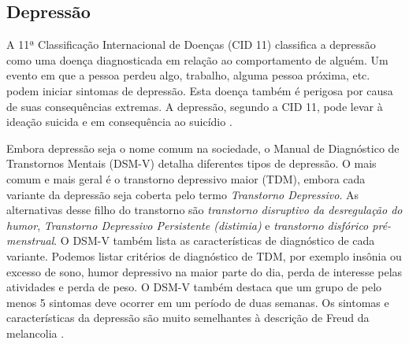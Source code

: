 \documentclass[11pt, notitlepage]{article} %
\begin{document}
\subsection*{Depressão}

A 11ª Classificação Internacional de Doenças (CID 11) classifica a depressão como uma doença diagnosticada em relação ao comportamento de alguém. Um evento em que a pessoa perdeu algo, trabalho, alguma pessoa próxima, etc. podem iniciar sintomas de depressão. Esta doença também é perigosa por causa de suas consequências extremas. A depressão, segundo a CID 11, pode levar à ideação suicida e em consequência ao suicídio \cite{american2013diagnostic}.

Embora depressão seja o nome comum na sociedade, o Manual de Diagnóstico de Transtornos Mentais (DSM-V) detalha diferentes tipos de depressão. O mais comum e mais geral é o transtorno depressivo maior (TDM), embora cada variante da depressão seja coberta pelo termo \textit{Transtorno Depressivo}. As alternativas desse filho do transtorno são \textit{transtorno disruptivo da desregulação do humor}, \textit{Transtorno Depressivo Persistente (distimia)} e \textit{transtorno disfórico pré-menstrual}. O DSM-V também lista as características de diagnóstico de cada variante. Podemos listar critérios de diagnóstico de TDM, por exemplo insônia ou excesso de sono, humor depressivo na maior parte do dia, perda de interesse pelas atividades e perda de peso. O DSM-V também destaca que um grupo de pelo menos 5 sintomas deve ocorrer em um período de duas semanas.
Os sintomas e características da depressão são muito semelhantes à descrição de Freud da melancolia \cite{freud1917mourning}.
\end{document}
